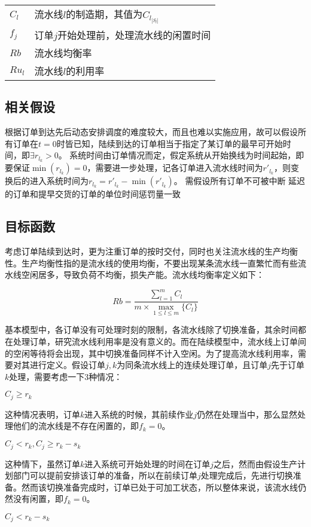 \begin{supertabular}{ll}
$C_l$ & 流水线$l$的制造期，其值为$C_{l_{|S_l|}}$ \\
$f_j$ & 订单$j$开始处理前，处理流水线的闲置时间\\
$Rb$ & 流水线均衡率 \\
$Ru_l$ & 流水线$l$的利用率\\ 
\end{supertabular}

\subsection{相关假设}
根据订单到达先后动态安排调度的难度较大，而且也难以实施应用，故可以假设所有订单在$t=0$时皆已知，陆续到达的订单相当于指定了某订单的最早可开始时间，即$\exists r_{l_k} >0$。
系统时间由订单情况而定，假定系统从开始换线为时间起始，即要保证$\min(r_{l_k}) = 0$，需要进一步处理，记各订单进入流水线时间为$r'_{l_k}$，则变换后的进入系统时间为$r_{l_k} = r'_{l_k} - \min(r'_{l_k})$。
需假设所有订单不可被中断
延迟的订单和提早交货的订单的单位时间惩罚量一致

\subsection{目标函数}
考虑订单陆续到达时，更为注重订单的按时交付，同时也关注流水线的生产均衡性。生产均衡性指的是流水线的使用均衡，不要出现某条流水线一直繁忙而有些流水线空闲居多，导致负荷不均衡，损失产能。流水线均衡率定义如下：

\[
Rb = \frac{\sum_{l=1}^m C_l}{\displaystyle m\times \max_{1 \le l \le m} \{C_l\}}
\]

基本模型中，各订单没有可处理时刻的限制，各流水线除了切换准备，其余时间都在处理订单，研究流水线利用率是没有意义的。而在陆续模型中，流水线上订单间的空闲等待将会出现，其中切换准备同样不计入空闲。为了提高流水线利用率，需要对其进行定义。假设订单$j,k$为同条流水线上的连续处理订单，且订单$j$先于订单$k$处理，需要考虑一下$3$种情况：

\begin{asparaenum}
\item $C_j \ge r_k$

这种情况表明，订单$k$进入系统的时候，其前续作业$j$仍然在处理当中，那么显然处理他们的流水线是不存在闲置的，即$f_k = 0$。
\item $C_j < r_k, C_j\ge r_k - s_k$

这种情下，虽然订单$k$进入系统可开始处理的时间在订单$j$之后，然而由假设生产计划部门可以提前安排该订单的准备，所以在前续订单$j$处理完成后，先进行切换准备。然而该切换准备完成时，订单已处于可加工状态，所以整体来说，该流水线仍然没有闲置，即$f_k = 0$。
\item $C_j < r_k - s_k$
\end{asparaenum}

